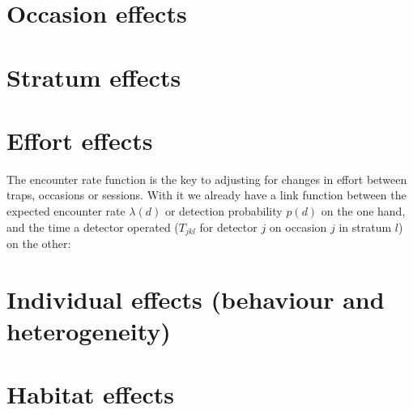 \documentclass[graybox,envcountchap,sectrefs]{SpringerStyleFiles/styles/svmono}\usepackage[]{graphicx}\usepackage[]{color}
\begin{document}
\section{Occasion effects}


\section{Stratum effects}


\section{Effort effects}

The encounter rate function is the key to adjusting for changes in effort between traps, occasions or sessions. With it we already have a link function between the expected encounter rate $\lambda(d)$ or detection probability $p(d)$ on the one hand, and the time a detector operated ($T_{jkl}$ for detector $j$ on occasion $j$ in stratum $l$) on the other:

\section{Individual effects (behaviour and heterogeneity)}


\section{Habitat effects} %



{}


\backmatter%


\printindex

\end{document}

